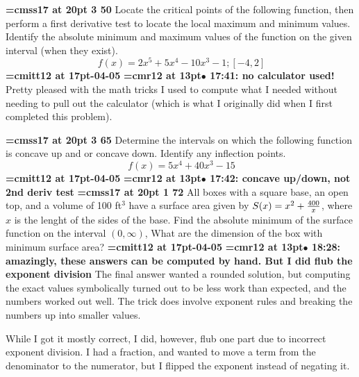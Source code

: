 {\medskip\noindent\bf\font\titlefont=cmss17 at 20pt 3 50}\medskip
Locate the critical points of the following function, then
perform a first derivative test to locate the local maximum and
minimum values. Identify the absolute minimum and maximum values
of the function on the given interval (when they exist).
$$\
f(x) = 2x^5 + 5x^4 - 10x^3 -1; [-4, 2]
$$
{\medskip\noindent\bf\font\titlefont=cmitt12 at 17pt-04-05}\medskip
{\smallskip\noindent\bf\font\titlefont=cmr12 at 13pt\titlefont $\bullet$ 17:41: no calculator used!}\smallskip
Pretty pleased with the math tricks I used to compute what I needed without needing to pull out the calculator (which is what I originally did when I first completed this problem).
\par

{\medskip\noindent\bf\font\titlefont=cmss17 at 20pt 3 65}\medskip
Determine the intervals on which the following function is
concave up and or concave down. Identify any inflection points.
$$\
f(x) = 5x^4 + 40x^3 - 15
$$
{\medskip\noindent\bf\font\titlefont=cmitt12 at 17pt-04-05}\medskip
{\smallskip\noindent\bf\font\titlefont=cmr12 at 13pt\titlefont $\bullet$ 17:42: concave up/down, not 2nd deriv test}\smallskip
\xrdef{node115}
{\medskip\noindent\bf\font\titlefont=cmss17 at 20pt\titlefont 4 1 72}\medskip
All boxes with a square base, an open top, and a volume of
100 ft$^3$ have a surface area given by $S(x) = x^2 + {400 \over x}$,
where $x$ is the lenght of the sides of the base. Find the
absolute minimum of the surface function on the interval
$(0, \infty)$, What are the dimension of the box with minimum surface
area?
{\medskip\noindent\bf\font\titlefont=cmitt12 at 17pt\titlefont 2026-04-05}\medskip
{\smallskip\noindent\bf\font\titlefont=cmr12 at 13pt\titlefont $\bullet$ 18:28: amazingly, these answers can be computed by hand. But I did flub the exponent division}\smallskip
The final answer wanted a rounded solution, but computing the exact values symbolically turned out to be less work than expected, and the numbers worked out well. The trick does involve exponent rules and breaking the numbers up into smaller values.
\par

While I got it mostly correct, I did, however, flub one part due to incorrect exponent division. I had a fraction, and wanted to move a term from the denominator to the numerator, but I flipped the exponent instead of negating it.
\par

